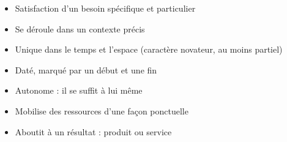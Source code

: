 \begin{itemize}
	\item Satisfaction d'un besoin spécifique et particulier
	\item Se déroule dans un contexte précis
	\item Unique dans le temps et l'espace (caractère novateur, au moins partiel)
	\item Daté, marqué par un début et une fin
	\item Autonome : il se suffit à lui même
	\item Mobilise des ressources d'une façon ponctuelle
	\item Aboutit à un résultat : produit ou service
\end{itemize}

